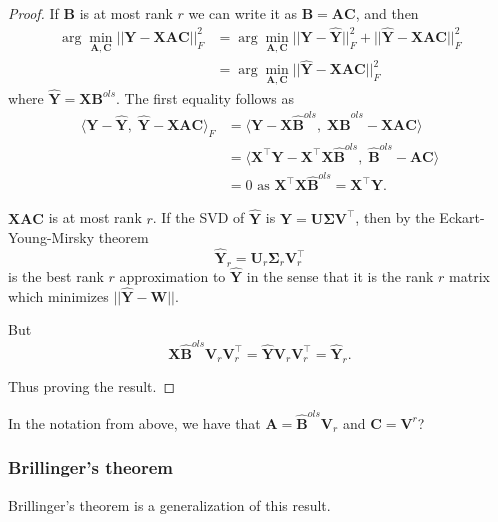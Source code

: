 \documentclass[
]{book}
\theoremstyle{definition}
\theoremstyle{definition}
\theoremstyle{definition}
\theoremstyle{definition}
\theoremstyle{remark}
\begin{document}
\begin{proof}
If \(\mathbf B\) is at most rank \(r\) we can write it as \(\mathbf B=\mathbf A\mathbf C\), and then
\begin{align}
\arg \min_{\mathbf A, \mathbf C} ||\mathbf Y-\mathbf X\mathbf A\mathbf C||_F^2
&= \arg \min_{\mathbf A, \mathbf C} ||\mathbf Y-\hat{\mathbf Y}||_F^2 + ||\hat{\mathbf Y}-\mathbf X\mathbf A\mathbf C||_F^2\\
&= \arg \min_{\mathbf A, \mathbf C} ||\hat{\mathbf Y}-\mathbf X\mathbf A\mathbf C||_F^2
\end{align}
where \(\hat{\mathbf Y}=\mathbf X\mathbf B^{ols}\).
The first equality follows as
\begin{align*}
\langle \mathbf Y-\hat{\mathbf Y},\; \hat{\mathbf Y}-\mathbf X\mathbf A\mathbf C\rangle_F &= \langle \mathbf Y-\mathbf X\hat{\mathbf B}^{ols}, \; \mathbf X\hat{\mathbf B}^{ols}-\mathbf X\mathbf A\mathbf C\rangle\\
&=\langle \mathbf X^\top\mathbf Y-\mathbf X^\top\mathbf X\hat{\mathbf B}^{ols}, \; \hat{\mathbf B}^{ols}-\mathbf A\mathbf C\rangle\\
&=0 \mbox{ as }\mathbf X^\top\mathbf X\hat{\mathbf B}^{ols} = \mathbf X^\top\mathbf Y.
\end{align*}

\(\mathbf X\mathbf A\mathbf C\) is at most rank \(r\).
If the SVD of \(\hat{\mathbf Y}\) is \(\hat{\mathbf Y} = \mathbf U\boldsymbol{\Sigma}\mathbf V^\top\), then by the Eckart-Young-Mirsky theorem
\[\hat{\mathbf Y}_r =\mathbf U_r\boldsymbol{\Sigma}_r\mathbf V_r^\top\]
is the best rank \(r\) approximation to \(\hat{\mathbf Y}\) in the sense that it is the rank \(r\) matrix which minimizes \(||\hat{\mathbf Y}-\mathbf W||\).

But
\[\mathbf X\hat{\mathbf B}^{ols}\mathbf V_r\mathbf V^\top_r = \hat{\mathbf Y}\mathbf V_r\mathbf V^\top_r  = \hat{\mathbf Y}_r.\]

Thus proving the result.
\end{proof}

In the notation from above, we have that \(\mathbf A=\hat{\mathbf B}^{ols}\mathbf V_r\) and \(\mathbf C=\mathbf V^r\)?

\hypertarget{brillingers-theorem}{%
\subsubsection{Brillinger's theorem}\label{brillingers-theorem}}

Brillinger's theorem is a generalization of this result.
\end{document}

